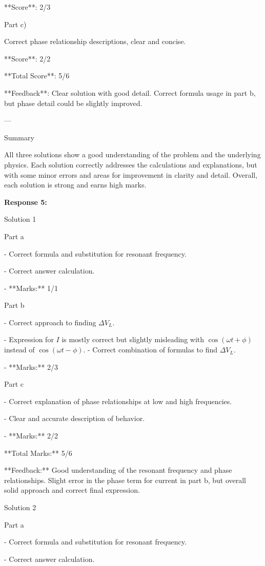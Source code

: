 \documentclass[a4paper,11pt]{article}
\begin{document}
   **Score**: 2/3

Part c)

Correct phase relationship descriptions, clear and concise.

   **Score**: 2/2

**Total Score**: 5/6

**Feedback**: Clear solution with good detail. Correct formula usage in part b, but phase detail could be slightly improved.

---

Summary

All three solutions show a good understanding of the problem and the underlying physics. Each solution correctly addresses the calculations and explanations, but with some minor errors and areas for improvement in clarity and detail. Overall, each solution is strong and earns high marks.

\bigskip
\textbf{Response 5:}

Solution 1

Part a

- Correct formula and substitution for resonant frequency.

- Correct answer calculation.

- **Marks:** 1/1

Part b

- Correct approach to finding \( \Delta V_{L} \).

- Expression for \( I \) is mostly correct but slightly misleading with \( \cos(\omega t + \phi) \) instead of \( \cos(\omega t - \phi) \).
- Correct combination of formulas to find \( \Delta V_{L} \).

- **Marks:** 2/3

Part c

- Correct explanation of phase relationships at low and high frequencies.

- Clear and accurate description of behavior.

- **Marks:** 2/2

**Total Marks:** 5/6

**Feedback:** Good understanding of the resonant frequency and phase relationships. Slight error in the phase term for current in part b, but overall solid approach and correct final expression.

Solution 2

Part a

- Correct formula and substitution for resonant frequency.

- Correct answer calculation.
\end{document}
